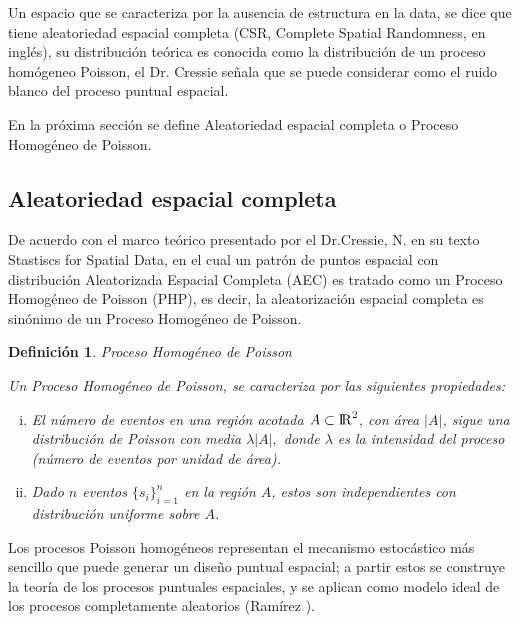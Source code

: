 \documentclass[12pt]{report}
\newtheorem{defi}{{\bf Definición}}[chapter]
\begin{document}
	Un espacio que se caracteriza por la ausencia de estructura en la data, se dice que tiene aleatoriedad espacial completa (CSR, Complete Spatial Randomness, en inglés), su distribución teórica es conocida como la distribución de un proceso homógeneo Poisson, el Dr. Cressie señala que se puede considerar como el ruido blanco del proceso puntual espacial.
	
	En la próxima sección se define Aleatoriedad espacial completa o Proceso Homogéneo de Poisson.
	
	\subsection{Aleatoriedad espacial completa}
	
	
	
	De acuerdo con el marco teórico presentado por el Dr.Cressie, N. en su texto Stastiscs for Spatial Data, en el cual un patrón de puntos espacial con distribución Aleatorizada Espacial Completa (AEC) es tratado como un Proceso Homogéneo de Poisson (PHP), es decir, la aleatorización espacial completa es sinónimo de un Proceso Homogéneo de Poisson.\\
	
	
	
	\begin{defi}{Proceso Homogéneo de Poisson}	\label{Def_Poisson}	
		
		
		Un Proceso Homogéneo de Poisson, se caracteriza por las siguientes propiedades:
		
		
		\begin{enumerate}[i.-]
			
			\item El número de eventos  en una región acotada $ A \subset {\rm I\!R}^{2} $, con área $|A|$, sigue una distribución de Poisson   con media  $ \lambda |A|, $ donde $ \lambda $ es la intensidad del proceso (número de eventos por unidad de área).	
			
			\item  Dado $n$ eventos $\{s_{i}\}_{i=1}^{n}$ en la región $A$, estos son independientes con distribución uniforme sobre  $A$.
			
		\end{enumerate}
		
		
	\end{defi}
	

	Los procesos Poisson homogéneos representan el mecanismo estocástico más sencillo que puede generar un diseño puntual espacial;    a partir estos se construye la teoría de los procesos puntuales espaciales, y se aplican como modelo ideal de los procesos completamente aleatorios (Ramírez \cite{Ramirez}).\\
	
\end{document}
